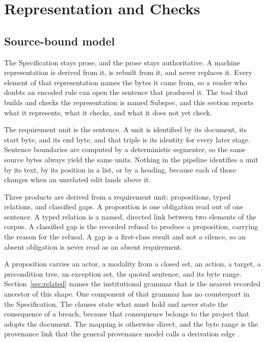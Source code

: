 \section{Representation and Checks}\label{sec:checks}

\subsection{Source-bound model}

The Specification stays prose, and the prose stays authoritative. A machine representation is derived from it, is rebuilt from it, and never replaces it. Every element of that representation names the bytes it came from, so a reader who doubts an encoded rule can open the sentence that produced it. The tool that builds and checks the representation is named Subspec, and this section reports what it represents, what it checks, and what it does not yet check.

The requirement unit is the sentence. A unit is identified by its document, its start byte, and its end byte, and that triple is its identity for every later stage. Sentence boundaries are computed by a deterministic segmenter, so the same source bytes always yield the same units. Nothing in the pipeline identifies a unit by its text, by its position in a list, or by a heading, because each of those changes when an unrelated edit lands above it.

Three products are derived from a requirement unit: propositions, typed relations, and classified gaps. A proposition is one obligation read out of one sentence. A typed relation is a named, directed link between two elements of the corpus. A classified gap is the recorded refusal to produce a proposition, carrying the reason for the refusal. A gap is a first-class result and not a silence, so an absent obligation is never read as an absent requirement.

A proposition carries an actor, a modality from a closed set, an action, a target, a precondition tree, an exception set, the quoted sentence, and its byte range. Section~\ref{sec:related} names the institutional grammar that is the nearest recorded ancestor of this shape. One component of that grammar has no counterpart in the Specification. The clauses state what must hold and never state the consequence of a breach, because that consequence belongs to the project that adopts the document. The mapping is otherwise direct, and the byte range is the provenance link that the general provenance model calls a derivation edge \citep{provdm2013}.

